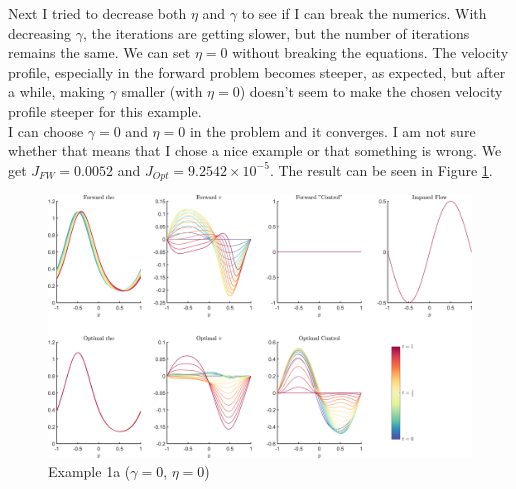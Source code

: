 \documentclass[11pt, a4paper]{article}
\theoremstyle{definition}
\begin{document}
    Next I tried to decrease both $\eta$ and $\gamma$ to see if I can break the numerics. With decreasing $\gamma$, the iterations are getting slower, but the number of iterations remains the same. We can set $\eta = 0$ without breaking the equations.
    The velocity profile, especially in the forward problem becomes steeper, as expected, but after a while, making $\gamma$ smaller (with $\eta = 0$) doesn't seem to make the chosen velocity profile steeper for this example.\\
    I can choose $\gamma = 0$ and $\eta =0$ in the problem and it converges. I am not sure whether that means that I chose a nice example or that something is wrong. We get $J_{FW}= 0.0052$ and $J_{Opt} = 9.2542\times 10^{-5}$. The result can be seen in Figure \ref{fig1a}.
    \begin{figure}
    	\includegraphics[scale=0.05]{Example1a.png}
    	\caption{Example 1a ($\gamma = 0$, $\eta = 0$)}
    	\label{fig1a}
    \end{figure}
    
\end{document}
